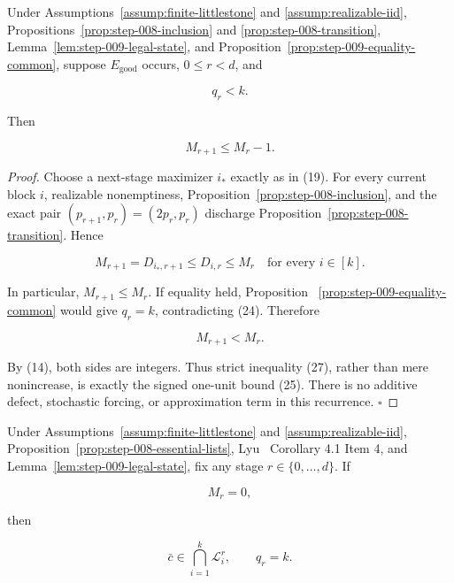 \begin{proposition}\label{prop:step-009-unit-drop}
Under Assumptions~\ref{assump:finite-littlestone} and
\ref{assump:realizable-iid}, 
Propositions~\ref{prop:step-008-inclusion} and
\ref{prop:step-008-transition}, Lemma~\ref{lem:step-009-legal-state}, and
Proposition~\ref{prop:step-009-equality-common}, suppose
\(E_{\mathrm{good}}\) occurs, \(0\le r<d\), and

\[
 q_r<k.
 \tag{24}
\]

Then

\[
 M_{r+1}\le M_r-1.
 \tag{25}
\]


\end{proposition}

\begin{proof}
Choose a next-stage maximizer \(i_*\) exactly as in (19). For every current
block \(i\), realizable nonemptiness,
Proposition~\ref{prop:step-008-inclusion}, and the exact pair
\((p_{r+1},p_r)=(2p_r,p_r)\) discharge
Proposition~\ref{prop:step-008-transition}. Hence

\[
 M_{r+1}=D_{i_*,r+1}
 \le D_{i,r}
 \le M_r
 \quad\text{for every }i\in[k].
 \tag{26}
\]

In particular, \(M_{r+1}\le M_r\). If equality held, Proposition
~\ref{prop:step-009-equality-common} would give \(q_r=k\), contradicting
(24). Therefore

\[
 M_{r+1}<M_r.
 \tag{27}
\]

By (14), both sides are integers. Thus strict inequality (27), rather than
mere nonincrease, is exactly the signed one-unit bound (25). There is no
additive defect, stochastic forcing, or approximation term in this
recurrence. \(\square\)


\end{proof}

\begin{proposition}\label{prop:step-009-zero-support}
Under Assumptions~\ref{assump:finite-littlestone} and
\ref{assump:realizable-iid}, Proposition~\ref{prop:step-008-essential-lists}, Lyu~\citep{lyu2025}
Corollary 4.1 Item 4, and Lemma~\ref{lem:step-009-legal-state}, fix any
stage \(r\in\{0,\ldots,d\}\). If

\[
 M_r=0,
 \tag{28}
\]

then

\[
 \bar c\in\bigcap_{i=1}^k\mathcal L_i^r,
 \qquad q_r=k.
 \tag{29}
\]


\end{proposition}


